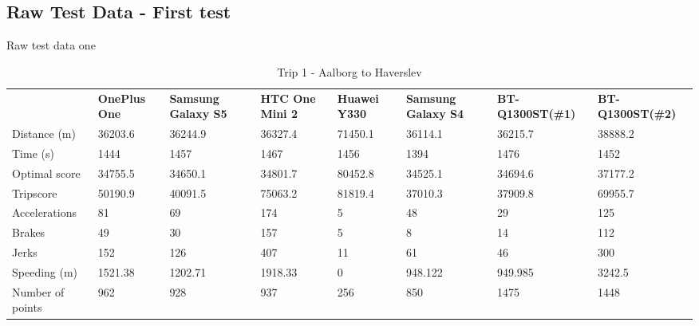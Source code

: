 \subsection*{Raw Test Data - First test}\label{app:rawtestdata1}
Raw test data one
\begin{table*}[tb]
\centering
\caption{Trip 1 - Aalborg to Haverslev}
\label{my-label}
\begin{tabular}{|l|lllllll|}
\hline
\rowcolor{tablegreen}

                 & \textbf{OnePlus One} & \textbf{Samsung Galaxy S5} & \textbf{HTC One Mini 2} & \textbf{Huawei Y330} & \textbf{Samsung Galaxy S4} & \textbf{BT-Q1300ST(\#1)} & \textbf{BT-Q1300ST(\#2)} \\
Distance (m)     & 36203.6     & 36244.9           & 36327.4        & 71450.1     & 36114.1           & 36215.7         & 38888.2         \\
Time (s)         & 1444        & 1457              & 1467           & 1456        & 1394              & 1476            & 1452            \\
Optimal score    & 34755.5     & 34650.1           & 34801.7        & 80452.8     & 34525.1           & 34694.6         & 37177.2         \\
Tripscore        & 50190.9     & 40091.5           & 75063.2        & 81819.4     & 37010.3           & 37909.8         & 69955.7         \\
Accelerations    & 81          & 69                & 174            & 5           & 48                & 29              & 125             \\
Brakes           & 49          & 30                & 157            & 5           & 8                 & 14              & 112             \\
Jerks            & 152         & 126               & 407            & 11          & 61                & 46              & 300             \\
Speeding (m)     & 1521.38     & 1202.71           & 1918.33        & 0           & 948.122           & 949.985         & 3242.5          \\
Number of points & 962         & 928               & 937            & 256         & 850               & 1475            & 1448      \\\hline 

\end{tabular}
\end{table*}


